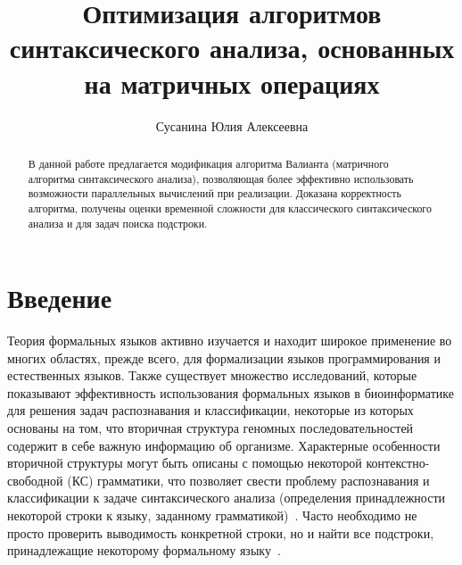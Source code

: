 
\newtheorem{lm}{Лемма}
\newtheorem{thrm}{Теорема}

\title{Оптимизация алгоритмов синтаксического анализа, основанных на матричных операциях}


\author{Сусанина Юлия Алексеевна}



\maketitle

\begin{abstract}
В данной работе предлагается модификация алгоритма Валианта (матричного алгоритма синтаксического анализа), позволяющая более эффективно использовать возможности параллельных вычислений при реализации. Доказана корректность алгоритма, получены оценки временной сложности для классического синтаксического анализа и для задач поиска подстроки.
\end{abstract}

\section*{Введение}

Теория формальных языков активно изучается и находит широкое применение во многих областях, прежде всего, для формализации языков программирования и естественных языков.
Также существует множество исследований, которые показывают эффективность использования формальных языков в биоинформатике  для решения задач распознавания и классификации, некоторые из которых основаны на том, что вторичная структура геномных последовательностей содержит в себе важную информацию об организме.
Характерные особенности вторичной структуры могут быть описаны с помощью некоторой контекстно-свободной (КС) грамматики, что позволяет свести проблему распознавания и классификации к задаче синтаксического анализа (определения принадлежности некоторой строки к языку, заданному грамматикой)~\cite{dowell2004evaluation, knudsen1999rna, rivas2000language}.
Часто необходимо не просто проверить выводимость конкретной строки, но и найти все подстроки, принадлежащие некоторому формальному языку~\cite{durbin1996biological}.

